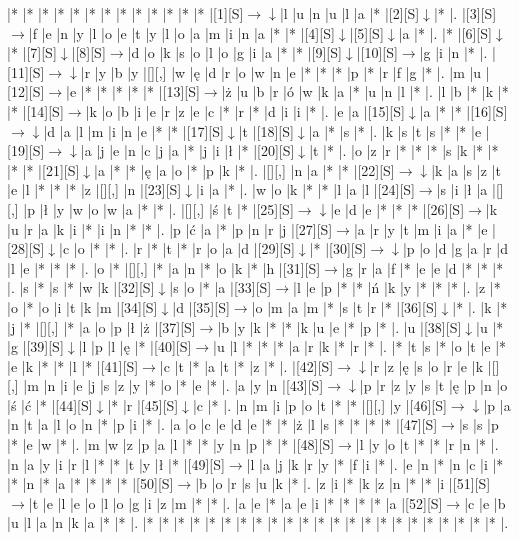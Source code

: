 \documentclass[11pt]{article}
\newcommand\drarr{$\rightarrow \!\!\!\!\! \downarrow$}
\newcommand\rarr{$\rightarrow$}
\newcommand\darr{$\downarrow$}
\begin{document}
\noindent\begin{Puzzle}{22}{29}|*	|*	|*	|*	|*	|*	|*	|*	|*	|*	|*	|*	|*	|[1][S]\drarr	|l	|u	|n	|u	|l	|a	|*	|[2][S]\darr	|*	|.
|[3][S]\rarr	|f	|e	|n	|y	|l	|o	|e	|t	|y	|l	|o	|a	|m	|i	|n	|a	|*	|*	|[4][S]\darr	|[5][S]\darr	|a	|*	|.
|*	|[6][S]\darr	|*	|[7][S]\darr	|[8][S]\rarr	|d	|o	|k	|s	|o	|l	|o	|g	|i	|a	|*	|*	|[9][S]\darr	|[10][S]\rarr	|g	|i	|n	|*	|.
|[11][S]\drarr	|r	|y	|b	|y	|[][,]{ }	|w	|ę	|d	|r	|o	|w	|n	|e	|*	|*	|*	|p	|*	|r	|f	|g	|*	|.
|m	|u	|[12][S]\rarr	|e	|*	|*	|*	|*	|*	|[13][S]\rarr	|ż	|u	|b	|r	|ó	|w	|k	|a	|*	|u	|n	|l	|*	|.
|l	|b	|*	|k	|*	|*	|[14][S]\rarr	|k	|o	|b	|i	|e	|r	|z	|e	|c	|*	|r	|*	|d	|i	|i	|*	|.
|e	|a	|[15][S]\darr	|a	|*	|*	|[16][S]\drarr	|d	|a	|l	|m	|i	|n	|e	|*	|*	|[17][S]\darr	|t	|[18][S]\darr	|a	|*	|s	|*	|.
|k	|s	|t	|s	|*	|*	|e	|[19][S]\drarr	|a	|j	|e	|n	|c	|j	|a	|*	|j	|i	|ł	|*	|[20][S]\darr	|t	|*	|.
|o	|z	|r	|*	|*	|*	|s	|k	|*	|*	|*	|*	|[21][S]\darr	|a	|*	|*	|ę	|a	|o	|*	|p	|k	|*	|.
|[][,]{ }	|n	|a	|*	|*	|[22][S]\drarr	|k	|a	|s	|z	|t	|e	|l	|*	|*	|*	|z	|[][,]{ }	|n	|[23][S]\darr	|i	|a	|*	|.
|w	|o	|k	|*	|*	|l	|a	|l	|[24][S]\rarr	|s	|i	|ł	|a	|[][,]{ }	|p	|ł	|y	|w	|o	|w	|a	|*	|*	|.
|[][,]{ }	|ś	|t	|*	|[25][S]\drarr	|e	|d	|e	|*	|*	|*	|[26][S]\rarr	|k	|u	|r	|a	|k	|i	|*	|i	|n	|*	|*	|.
|p	|ć	|a	|*	|p	|n	|r	|j	|[27][S]\rarr	|a	|r	|y	|t	|m	|i	|a	|*	|e	|[28][S]\darr	|c	|o	|*	|*	|.
|r	|*	|t	|*	|r	|o	|a	|d	|[29][S]\darr	|*	|[30][S]\drarr	|p	|o	|d	|g	|a	|r	|d	|l	|e	|*	|*	|*	|.
|o	|*	|[][,]{ }	|*	|a	|n	|*	|o	|k	|*	|h	|[31][S]\rarr	|g	|r	|a	|f	|*	|e	|e	|d	|*	|*	|*	|.
|s	|*	|s	|*	|w	|k	|[32][S]\darr	|s	|o	|*	|a	|[33][S]\rarr	|l	|e	|p	|*	|*	|ń	|k	|y	|*	|*	|*	|.
|z	|*	|o	|*	|o	|i	|t	|k	|m	|[34][S]\darr	|d	|[35][S]\rarr	|o	|m	|a	|m	|*	|s	|t	|r	|*	|[36][S]\darr	|*	|.
|k	|*	|j	|*	|[][,]{ }	|*	|a	|o	|p	|ł	|ż	|[37][S]\rarr	|b	|y	|k	|*	|*	|k	|u	|e	|*	|p	|*	|.
|u	|[38][S]\darr	|u	|*	|g	|[39][S]\darr	|l	|p	|l	|ę	|*	|[40][S]\rarr	|u	|l	|*	|*	|*	|a	|r	|k	|*	|r	|*	|.
|*	|t	|s	|*	|o	|t	|e	|*	|e	|k	|*	|*	|l	|*	|[41][S]\rarr	|c	|t	|*	|a	|t	|*	|z	|*	|.
|[42][S]\drarr	|r	|z	|ę	|s	|o	|r	|e	|k	|[][,]{ }	|m	|n	|i	|e	|j	|s	|z	|y	|*	|o	|*	|e	|*	|.
|a	|y	|n	|[43][S]\drarr	|p	|r	|z	|y	|s	|t	|ę	|p	|n	|o	|ś	|ć	|*	|[44][S]\darr	|*	|r	|[45][S]\darr	|c	|*	|.
|n	|m	|i	|p	|o	|t	|*	|*	|[][,]{ }	|y	|[46][S]\drarr	|p	|a	|n	|t	|a	|l	|o	|n	|*	|p	|i	|*	|.
|a	|o	|c	|e	|d	|e	|*	|*	|ż	|l	|s	|*	|*	|*	|*	|[47][S]\rarr	|s	|s	|p	|*	|e	|w	|*	|.
|m	|w	|z	|p	|a	|l	|*	|*	|y	|n	|p	|*	|*	|[48][S]\rarr	|l	|y	|o	|t	|*	|*	|r	|n	|*	|.
|n	|a	|y	|i	|r	|l	|*	|*	|t	|y	|ł	|*	|[49][S]\rarr	|l	|a	|j	|k	|r	|y	|*	|f	|i	|*	|.
|e	|n	|*	|n	|c	|i	|*	|*	|n	|*	|a	|*	|*	|*	|*	|[50][S]\rarr	|b	|o	|r	|s	|u	|k	|*	|.
|z	|i	|*	|k	|z	|n	|*	|*	|i	|[51][S]\rarr	|t	|e	|l	|e	|o	|l	|o	|g	|i	|z	|m	|*	|*	|.
|a	|e	|*	|a	|e	|i	|*	|*	|*	|*	|a	|[52][S]\rarr	|c	|e	|b	|u	|l	|a	|n	|k	|a	|*	|*	|.
|*	|*	|*	|*	|*	|*	|*	|*	|*	|*	|*	|*	|*	|*	|*	|*	|*	|*	|*	|*	|*	|*	|*	|.\end{Puzzle}
\end{document}
